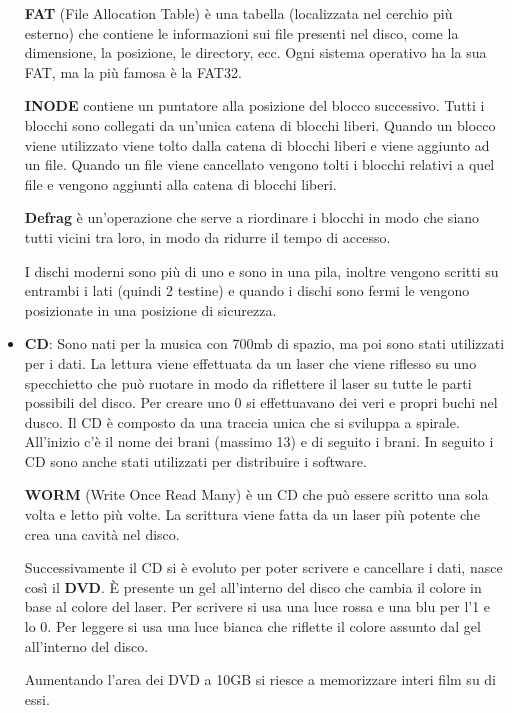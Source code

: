 \documentclass[a4paper]{article}
\theoremstyle{break}
\theoremstyle{break}
\theoremstyle{break}
\theoremstyle{break}
\begin{document}
\begin{itemize}
    \vspace{1em}
    \textbf{FAT} (File Allocation Table) è una tabella (localizzata nel cerchio più esterno)
    che contiene le informazioni
    sui file presenti nel disco, come la dimensione, la posizione, le directory, ecc. 
    Ogni sistema operativo ha la sua FAT, ma la più famosa è la FAT32.

    \vspace{1em}
    \noindent \textbf{INODE} contiene un puntatore alla posizione del blocco successivo.
    Tutti i blocchi sono collegati da un'unica catena di blocchi liberi. Quando un blocco
    viene utilizzato viene tolto dalla catena di blocchi liberi e viene aggiunto ad
    un file. Quando un file viene cancellato vengono tolti i blocchi relativi a quel file
    e vengono aggiunti alla catena di blocchi liberi.

    \vspace{1em}
    \noindent \textbf{Defrag} è un'operazione che serve a riordinare i blocchi in modo
    che siano tutti vicini tra loro, in modo da ridurre il tempo di accesso.

    \vspace{1em}
    \noindent I dischi moderni sono più di uno e sono in una pila, inoltre vengono
    scritti su entrambi i lati (quindi 2 testine) e quando i dischi sono fermi le
    vengono posizionate in una posizione di sicurezza.

  \item \textbf{CD}: Sono nati per la musica con 700mb di spazio, ma poi sono stati utilizzati per i dati.
    La lettura viene effettuata da un laser che viene riflesso su uno specchietto che
    può ruotare in modo da riflettere il laser su tutte le parti possibili del disco.
    Per creare uno 0 si effettuavano dei veri e propri buchi nel dusco. Il CD è composto
    da una traccia unica che si sviluppa a spirale. All'inizio c'è il nome dei brani (massimo 13)
    e di seguito i brani. In seguito i CD sono anche stati utilizzati per distribuire i
    software.

    \vspace{1em}
    \noindent \textbf{WORM} (Write Once Read Many) è un CD che può essere scritto una sola
    volta e letto più volte. La scrittura viene fatta da un laser più potente che crea
    una cavità nel disco.

    \vspace{1em}
    \noindent Successivamente il CD si è evoluto per poter scrivere e cancellare i dati,
    nasce così il \textbf{DVD}. È presente un gel all'interno del disco che cambia il colore in
    base al colore del laser. Per scrivere si usa una luce rossa e una blu per l'1 e lo 0.
    Per leggere si usa una luce bianca che riflette il colore assunto dal gel all'interno 
    del disco.

    \vspace{1em}
    \noindent Aumentando l'area dei DVD a 10GB si riesce a memorizzare interi film su di
    essi.
\end{itemize}
\end{document}
